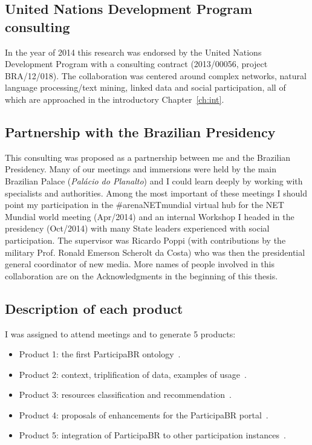 \begin{apendicesenv}
\section{United Nations Development Program consulting}\label{sec:undp}
In the year of 2014 this research was endorsed by the United Nations Development Program
with a consulting contract (2013/00056, project BRA/12/018).
The collaboration was centered around complex networks,
natural language processing/text mining, linked data and social participation,
all of which are approached in the introductory Chapter~\ref{ch:int}.

\subsection{Partnership with the Brazilian Presidency}
This consulting was proposed as a partnership between me
and the Brazilian Presidency.
Many of our meetings and immersions were held by the main Brazilian Palace (\emph{Palácio do Planalto})
and I could learn deeply by working with specialists and authorities.
Among the most important of these meetings I should point
my participation in the \#arenaNETmundial virtual hub for the NET Mundial world meeting (Apr/2014)
and an internal Workshop I headed in the presidency (Oct/2014) with many State leaders experienced with social participation.
The supervisor was Ricardo Poppi (with contributions by the military Prof. Ronald Emerson Scherolt da Costa)
who was then the presidential general coordinator of new media.
More names of people involved in this collaboration are on the Acknowledgments in the beginning of this thesis.

\subsection{Description of each product}
I was assigned to attend meetings and to generate 5 products:
\begin{itemize}
	\item Product 1: the first ParticipaBR ontology~\cite{opa0}.
	\item Product 2: context, triplification of data, examples of usage~\cite{pnud2}.
	\item Product 3: resources classification and recommendation~\cite{pnud3}.
	\item Product 4: proposals of enhancements for the ParticipaBR portal~\cite{pnud4}.
	\item Product 5: integration of ParticipaBR to other participation instances~\cite{opa}.
\end{itemize}


\end{apendicesenv}
